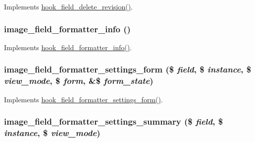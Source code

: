 Implements \hyperlink{group__field__types_gaef667d4ba12f6fb9950876e6f4f63878}{hook\_\-field\_\-delete\_\-revision()}. \hypertarget{image_8field_8inc_a8d8f3405a50964513fca7c96eff62baf}{
\subsubsection[{image\_\-field\_\-formatter\_\-info}]{\setlength{\rightskip}{0pt plus 5cm}image\_\-field\_\-formatter\_\-info ()}}
\label{image_8field_8inc_a8d8f3405a50964513fca7c96eff62baf}
Implements \hyperlink{group__field__formatter_ga2f5aa1c7455f55dffd84a48efa57f987}{hook\_\-field\_\-formatter\_\-info()}. \hypertarget{image_8field_8inc_a444be283783538860ecb910f01cabe20}{
\subsubsection[{image\_\-field\_\-formatter\_\-settings\_\-form}]{\setlength{\rightskip}{0pt plus 5cm}image\_\-field\_\-formatter\_\-settings\_\-form (\$ {\em field}, \/  \$ {\em instance}, \/  \$ {\em view\_\-mode}, \/  \$ {\em form}, \/  \&\$ {\em form\_\-state})}}
\label{image_8field_8inc_a444be283783538860ecb910f01cabe20}
Implements \hyperlink{group__field__types_gaf9b6aefe0b4fe6c03ebd5bd9bd1b891b}{hook\_\-field\_\-formatter\_\-settings\_\-form()}. \hypertarget{image_8field_8inc_ab45c6072856919957630510a04279fa6}{
\subsubsection[{image\_\-field\_\-formatter\_\-settings\_\-summary}]{\setlength{\rightskip}{0pt plus 5cm}image\_\-field\_\-formatter\_\-settings\_\-summary (\$ {\em field}, \/  \$ {\em instance}, \/  \$ {\em view\_\-mode})}}
\label{image_8field_8inc_ab45c6072856919957630510a04279fa6}
